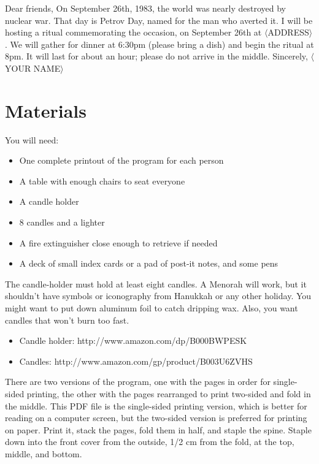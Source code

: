 \documentclass{article}
\begin{document}
\begin{center}
	\parbox{4.5in}{
	Dear friends,\newline
	On September 26th, 1983, the world was nearly destroyed by nuclear war.
	That day is Petrov Day, named for the man who averted it. I will be hosting
	a ritual commemorating the occasion, on September 26th at $\langle$ADDRESS$\rangle$. We
	will gather for dinner at 6:30pm (please bring a dish) and begin the ritual
	at 8pm. It will last for about an hour; please do not arrive in the middle.\newline
	Sincerely,\newline
	$\langle$YOUR NAME$\rangle$}
\end{center}

\section{Materials}
You will need:

\begin{itemize} \itemsep0pt \parskip0pt 
	\item One complete printout of the program for each person
	\item A table with enough chairs to seat everyone
	\item A candle holder
	\item 8 candles and a lighter
	\item A fire extinguisher close enough to retrieve if needed
	\item A deck of small index cards or a pad of post-it notes, and some pens
\end{itemize}

The candle-holder must hold at least eight candles. A Menorah will work, but it
shouldn't have symbols or iconography from Hanukkah or any other holiday. You
might want to put down aluminum foil to catch dripping wax. Also, you want
candles that won't burn too fast.

\begin{itemize} \itemsep0pt \parskip0pt 
	\item Candle holder: http://www.amazon.com/dp/B000BWPESK
	\item Candles: http://www.amazon.com/gp/product/B003U6ZVHS
\end{itemize}

There are two versions of the program, one with the pages in order for
single-sided printing, the other with the pages rearranged to print two-sided
and fold in the middle. This PDF file is the single-sided printing version,
which is better for reading on a computer screen, but the two-sided version is
preferred for printing on paper. Print it, stack the pages, fold them in half,
and staple the spine. Staple down into the front cover from the outside, 1/2
cm from the fold, at the top, middle, and bottom.
\end{document}
